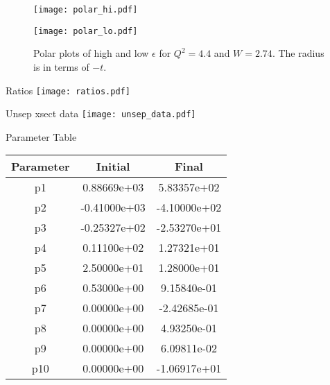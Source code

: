 %
%

\begin{figure}
  \centering
  \begin{minipage}[b]{0.48\linewidth}
    \texttt{[image: polar\_hi.pdf]}
  \end{minipage}
  \hfill
  \begin{minipage}[b]{0.48\linewidth}
    \texttt{[image: polar\_lo.pdf]}
  \end{minipage}
  
  \caption{Polar plots of high and low $\epsilon$ for $Q^2=4.4$ and $W=2.74$. The radius is in terms of $-t$.}
  \label{fig:7-1_polar}
\end{figure}

\begin{Mfigure}{Ratios}
  \centering
  \texttt{[image: ratios.pdf]}
  \caption{Comparison of data to SIMC yield ratios for $Q^2=3.0$, $W=3.14$ for the lowest $t$-bin ($-t=0.215$).}
  \label{fig:7-1_ratios}
\end{Mfigure}

\begin{Mfigure}{Unsep xsect data}
  \centering
  \texttt{[image: unsep\_data.pdf]}
  \caption{Unseparated cross section for $Q^2=3.0$, $W=3.14$ for the lowest $t$-bin ($-t=0.215$). The fit is the unseparated cross section of eqn. \ref{eq:unsep_xsect} which simultaneously fits L, T, LT, and TT.}
  \label{fig:7-1_unsep_data}
\end{Mfigure}

\begin{Mtable}{Parameter Table}
  \centering
  \begin{tabular}{|c|c|c|}
    \hline
    \textbf{Parameter} & \textbf{Initial} & \textbf{Final} \\
    \hline    
    p1 &  0.88669e+03 &   5.83357e+02 \\
    p2 & -0.41000e+03 &  -4.10000e+02 \\
    p3 & -0.25327e+02 &  -2.53270e+01 \\
    p4 &  0.11100e+02 &   1.27321e+01 \\
    p5 &  2.50000e+01 &   1.28000e+01 \\
    p6 &  0.53000e+00 &   9.15840e-01 \\
    p7 &  0.00000e+00 &  -2.42685e-01 \\
    p8 &  0.00000e+00 &   4.93250e-01 \\
    p9 &  0.00000e+00 &   6.09811e-02 \\
    p10 & 0.00000e+00 &  -1.06917e+01 \\
    \hline
    \end{tabular}
  \caption{Result of iterated fit parameters from eqns \ref{eq:model_sig_l}-\ref{eq:model_sig_tt}. Convergence was achieved in 3 iterations.}
  \label{tab:7-1_sig_params}
\end{Mtable}

